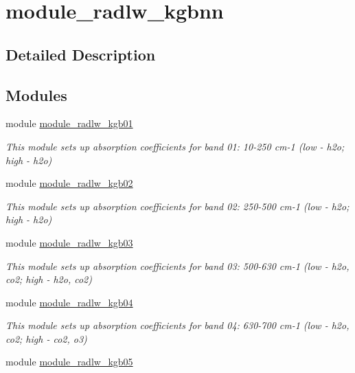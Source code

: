 \hypertarget{group__module__radlw__kgbnn}{}\section{module\+\_\+radlw\+\_\+kgbnn}
\label{group__module__radlw__kgbnn}


\subsection{Detailed Description}
\subsection*{Modules}
\begin{DoxyCompactItemize}
\item 
module \hyperlink{namespacemodule__radlw__kgb01}{module\+\_\+radlw\+\_\+kgb01}
\begin{DoxyCompactList}\small\item\em This module sets up absorption coefficients for band 01\+: 10-\/250 cm-\/1 (low -\/ h2o; high -\/ h2o) \end{DoxyCompactList}\item 
module \hyperlink{namespacemodule__radlw__kgb02}{module\+\_\+radlw\+\_\+kgb02}
\begin{DoxyCompactList}\small\item\em This module sets up absorption coefficients for band 02\+: 250-\/500 cm-\/1 (low -\/ h2o; high -\/ h2o) \end{DoxyCompactList}\item 
module \hyperlink{namespacemodule__radlw__kgb03}{module\+\_\+radlw\+\_\+kgb03}
\begin{DoxyCompactList}\small\item\em This module sets up absorption coefficients for band 03\+: 500-\/630 cm-\/1 (low -\/ h2o, co2; high -\/ h2o, co2) \end{DoxyCompactList}\item 
module \hyperlink{namespacemodule__radlw__kgb04}{module\+\_\+radlw\+\_\+kgb04}
\begin{DoxyCompactList}\small\item\em This module sets up absorption coefficients for band 04\+: 630-\/700 cm-\/1 (low -\/ h2o, co2; high -\/ co2, o3) \end{DoxyCompactList}\item 
module \hyperlink{namespacemodule__radlw__kgb05}{module\+\_\+radlw\+\_\+kgb05}

\end{DoxyCompactItemize}
